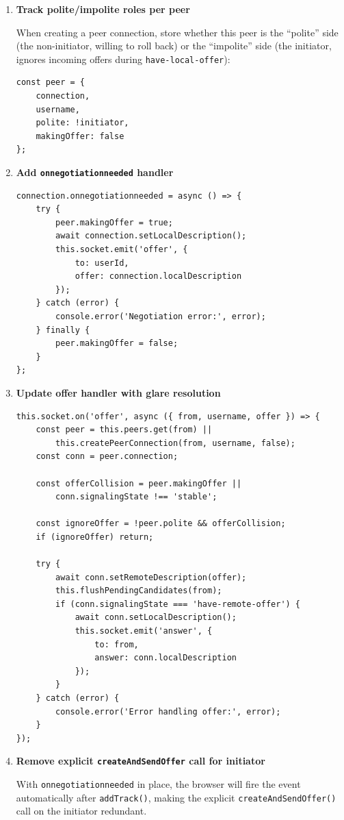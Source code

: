 \documentclass[11pt,letterpaper]{article}
\begin{document}
\begin{enumerate}[leftmargin=2em]
    \item \textbf{Track polite/impolite roles per peer}

    When creating a peer connection, store whether this peer is the ``polite'' side (the non-initiator, willing to roll back) or the ``impolite'' side (the initiator, ignores incoming offers during \texttt{have-local-offer}):

    \begin{verbatim}
const peer = {
    connection,
    username,
    polite: !initiator,
    makingOffer: false
};
    \end{verbatim}

    \item \textbf{Add \texttt{onnegotiationneeded} handler}

    \begin{verbatim}
connection.onnegotiationneeded = async () => {
    try {
        peer.makingOffer = true;
        await connection.setLocalDescription();
        this.socket.emit('offer', {
            to: userId,
            offer: connection.localDescription
        });
    } catch (error) {
        console.error('Negotiation error:', error);
    } finally {
        peer.makingOffer = false;
    }
};
    \end{verbatim}

    \item \textbf{Update offer handler with glare resolution}

    \begin{verbatim}
this.socket.on('offer', async ({ from, username, offer }) => {
    const peer = this.peers.get(from) ||
        this.createPeerConnection(from, username, false);
    const conn = peer.connection;

    const offerCollision = peer.makingOffer ||
        conn.signalingState !== 'stable';

    const ignoreOffer = !peer.polite && offerCollision;
    if (ignoreOffer) return;

    try {
        await conn.setRemoteDescription(offer);
        this.flushPendingCandidates(from);
        if (conn.signalingState === 'have-remote-offer') {
            await conn.setLocalDescription();
            this.socket.emit('answer', {
                to: from,
                answer: conn.localDescription
            });
        }
    } catch (error) {
        console.error('Error handling offer:', error);
    }
});
    \end{verbatim}

    \item \textbf{Remove explicit \texttt{createAndSendOffer} call for initiator}

    With \texttt{onnegotiationneeded} in place, the browser will fire the event automatically after \texttt{addTrack()}, making the explicit \texttt{createAndSendOffer()} call on the initiator redundant.
\end{enumerate}
\end{document}
